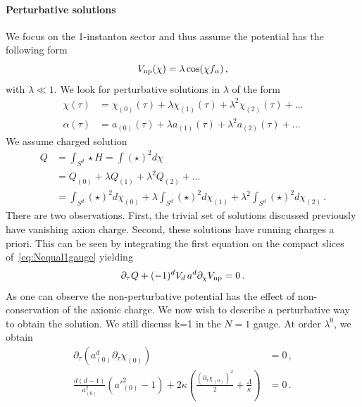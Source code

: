 \documentclass[a4paper]{article}
\def\a{\alpha}
\begin{document}
\paragraph{Perturbative solutions} We focus on the 1-instanton sector and thus assume the potential has the following form 
\begin{equation}
  V_{\rm np}(\chi) = \lambda \cos(\chi f_{\alpha})\,,
\end{equation}
with $\lambda \ll 1$. We look for perturbative solutions in $\lambda$ of the form
\begin{equation}
\begin{aligned}
  \chi(\tau) &= \chi_{(0)}(\tau) + \lambda \chi_{(1)}(\tau) + \lambda^2 \chi_{(2)}(\tau) + \dots \\
  \a(\tau) &= a_{(0)}(\tau) + \lambda a_{(1)}(\tau) + \lambda^2 a_{(2)}(\tau) + \dots
\end{aligned}
\end{equation}
We assume charged solution
\begin{equation}
\begin{aligned}
  Q &= \int_{S^d} \star H = \int (\star)^2 d\chi \\
    &= Q_{(0)} + \lambda Q_{(1)} + \lambda^2 Q_{(2)} + \dots \\
    &= \int_{S^d} (\star)^2 d\chi_{(0)} + \lambda \int_{S^d} (\star)^2 d\chi_{(1)} + \lambda^2  \int_{S^d} (\star)^2 d\chi_{(2)}\,.
\end{aligned}
\end{equation}
There are two observations. First, the trivial set of solutions discussed previously have vanishing axion charge. Second, these solutions have running charges a priori. This can be seen by integrating the first equation on the compact slices of~\eqref{eq:Nequal1gauge} yielding
\begin{equation}
  \partial_\tau Q + (-1)^dV_d\,a^d \partial_\chi V_{\rm np} = 0\,.
\end{equation}
As one can observe the non-perturbative potential has the effect of non-conservation of the axionic charge. We now wish to describe a perturbative way to obtain the solution. We still discuss k=1 in the $N=1$ gauge. At order $\lambda^0$, we obtain
\begin{equation}
  \begin{aligned}
    \partial_{\tau}\left(a^d_{(0)}\partial_{\tau}\chi_{(0)}\right)&=0\,,\\
    \frac{d(d-1)}{a_{(0)}^2}\left(a'^2_{(0)}-1\right)+2\kappa\left(\frac{(\partial_\tau \chi_{(0)})^2}{2}+\frac{\Lambda}{\kappa}\right)&=0\,.\\
  \end{aligned}
\end{equation}
\end{document}
